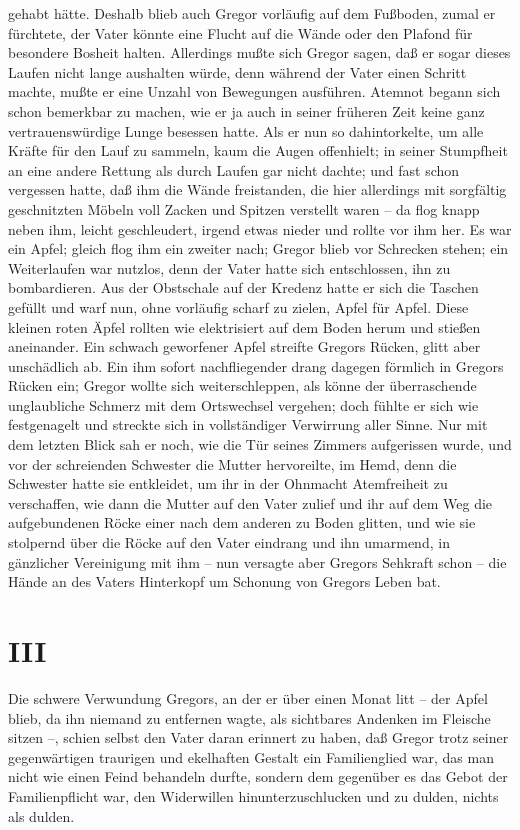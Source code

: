 gehabt hätte. Deshalb blieb auch Gregor vorläufig auf dem Fußboden,
zumal er fürchtete, der Vater könnte eine Flucht auf die Wände oder den
Plafond für besondere Bosheit halten. Allerdings mußte sich Gregor
sagen, daß er sogar dieses Laufen nicht lange aushalten würde, denn
während der Vater einen Schritt machte, mußte er eine Unzahl von
Bewegungen ausführen. Atemnot begann sich schon bemerkbar zu machen, wie
er ja auch in seiner früheren Zeit keine ganz vertrauenswürdige Lunge
besessen hatte. Als er nun so dahintorkelte, um alle Kräfte für den Lauf
zu sammeln, kaum die Augen offenhielt; in seiner Stumpfheit an eine
andere Rettung als durch Laufen gar nicht dachte; und fast schon
vergessen hatte, daß ihm die Wände freistanden, die hier allerdings mit
sorgfältig geschnitzten Möbeln voll Zacken und Spitzen verstellt waren
-- da flog knapp neben ihm, leicht geschleudert, irgend etwas nieder und
rollte vor ihm her. Es war ein Apfel; gleich flog ihm ein zweiter nach;
Gregor blieb vor Schrecken stehen; ein Weiterlaufen war nutzlos, denn
der Vater hatte sich entschlossen, ihn zu bombardieren. Aus der
Obstschale auf der Kredenz hatte er sich die Taschen gefüllt und warf
nun, ohne vorläufig scharf zu zielen, Apfel für Apfel. Diese kleinen
roten Äpfel rollten wie elektrisiert auf dem Boden herum und stießen
aneinander. Ein schwach geworfener Apfel streifte Gregors Rücken, glitt
aber unschädlich ab. Ein ihm sofort nachfliegender drang dagegen
förmlich in Gregors Rücken ein; Gregor wollte sich weiterschleppen, als
könne der überraschende unglaubliche Schmerz mit dem Ortswechsel
vergehen; doch fühlte er sich wie festgenagelt und streckte sich in
vollständiger Verwirrung aller Sinne. Nur mit dem letzten Blick sah er
noch, wie die Tür seines Zimmers aufgerissen wurde, und vor der
schreienden Schwester die Mutter hervoreilte, im Hemd, denn die
Schwester hatte sie entkleidet, um ihr in der Ohnmacht Atemfreiheit zu
verschaffen, wie dann die Mutter auf den Vater zulief und ihr auf dem
Weg die aufgebundenen Röcke einer nach dem anderen zu Boden glitten, und
wie sie stolpernd über die Röcke auf den Vater eindrang und ihn
umarmend, in gänzlicher Vereinigung mit ihm -- nun versagte aber Gregors
Sehkraft schon -- die Hände an des Vaters Hinterkopf um Schonung von
Gregors Leben bat.

\quebra\section{III}

Die schwere Verwundung Gregors, an der er über einen Monat litt -- der
Apfel blieb, da ihn niemand zu entfernen wagte, als sichtbares Andenken
im Fleische sitzen --, schien selbst den Vater daran erinnert zu haben,
daß Gregor trotz seiner gegenwärtigen traurigen und ekelhaften Gestalt
ein Familienglied war, das man nicht wie einen Feind behandeln durfte,
sondern dem gegenüber es das Gebot der Familienpflicht war, den
Widerwillen hinunterzuschlucken und zu dulden, nichts als dulden.

